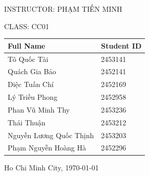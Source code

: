 \documentclass[12pt,a4paper]{article}
\numberwithin{table}{section}    %
\numberwithin{figure}{section}   %
\begin{document}
\begin{titlepage}
  \vspace{2em}
  {\large INSTRUCTOR: PHẠM TIẾN MINH}\par
  \vspace{1em}
  {\large CLASS: CC01}\par
  \vspace{3em}
  \begin{tabular}{ll}
    \hline
    \textbf{Full Name} & \textbf{Student ID} \\
    \hline
    Tô Quốc Tài & 2453141 \\
    Quách Gia Bảo & 2452141 \\
    Diệc Tuấn Chí & 2452169 \\
    Lý Triều Phong & 2452958 \\
    Phan Vũ Minh Thy & 2453236 \\
    Thái Thuận & 2453212 \\
    Nguyễn Lương Quốc Thịnh & 2453203 \\
    Phạm Nguyễn Hoàng Hà & 2452296 \\
    \hline
  \end{tabular}

  \vspace{1em}
  {\footnotesize Ho Chi Minh City, \today}
\end{titlepage}
\setcounter{page}{2}


\clearpage

\tableofcontents
\clearpage












\end{document}
